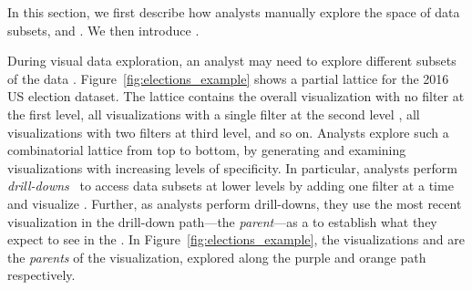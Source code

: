 In this section, we first describe how analysts
manually explore the space of data subsets,
and .
We then introduce .

During visual data exploration,
an analyst may need to explore different subsets
of the data .
Figure~\ref{fig:elections_example}
shows a partial lattice for the 2016 US election dataset.
The lattice contains the overall visualization
with no filter at the first level,
all visualizations with a single filter
at the second level ,
all visualizations with two filters at third level,
and so on.
Analysts explore such a combinatorial lattice
from top to bottom, by generating and examining
visualizations with increasing levels of specificity.
In particular, analysts perform \emph{drill-downs}~\cite{Gray1997}
to access data subsets at lower levels by
adding one filter at a time
and visualize
.
Further, as analysts perform drill-downs,
they use the most recent visualization
in the drill-down path---the {\em parent}---as a 
to establish what they expect to see in the
.
In Figure~\ref{fig:elections_example},
the visualizations \fem and \blk
are the \emph{parents} of the \blkfem visualization,
explored along the purple and orange path respectively.

